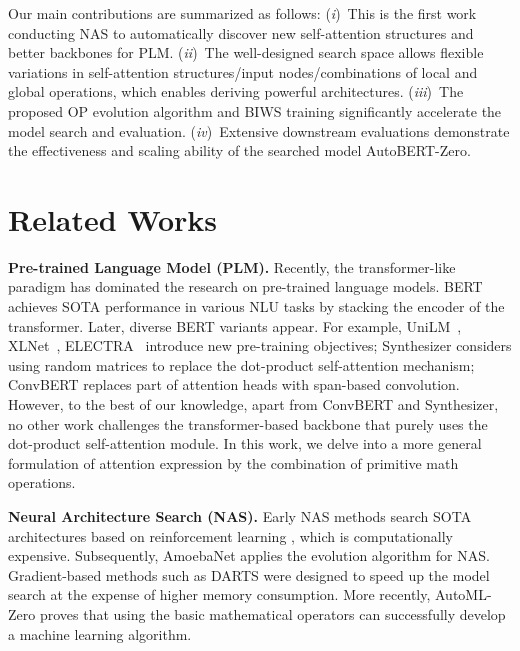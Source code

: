 \documentclass[letterpaper]{article} \usepackage{aaai22}  \usepackage{times}  \usepackage{helvet}  \usepackage{courier}  \usepackage[hyphens]{url}  \usepackage{graphicx} \urlstyle{rm} \def\UrlFont{\rm}  \usepackage{natbib}  \usepackage{caption} \DeclareCaptionStyle{ruled}{labelfont=normalfont,labelsep=colon,strut=off} \frenchspacing  \setlength{\pdfpagewidth}{8.5in}  \setlength{\pdfpageheight}{11in}  \usepackage{algorithm}
\newcommand{\Ni}{({\em i})~}
\newcommand{\Nii}{({\em ii})~}
\newcommand{\Niii}{({\em iii})~}
\newcommand{\Niv}{({\em iv})~}
\begin{document}
Our main contributions are summarized as follows:
\Ni This is the first work conducting NAS to automatically discover new self-attention structures and better backbones for PLM. 
\Nii The well-designed search space allows flexible variations in self-attention structures/input nodes/combinations of local and global operations, which enables deriving powerful architectures. 
\Niii The proposed OP evolution algorithm and BIWS training significantly accelerate the model search and evaluation.
\Niv Extensive downstream evaluations demonstrate the effectiveness and scaling ability of the searched model AutoBERT-Zero.




\vspace{-2mm}
\section{Related Works}\label{sec:related_work}
\textbf{Pre-trained Language Model (PLM).}
Recently, the transformer-like paradigm \citep{vaswani2017attention,radford2018improving} has dominated the research on pre-trained language models.
BERT \citep{devlin2019bert} achieves SOTA performance in various NLU tasks by stacking the encoder of the transformer.
Later, diverse BERT variants appear. For example, UniLM~\citep{dong2019unified}, XLNet~\cite{yang2019xlnet}, ELECTRA~\cite{clark2019electra} introduce new pre-training objectives;
Synthesizer \citep{tay2020synthesizer} considers using random matrices to replace the dot-product self-attention mechanism; ConvBERT \citep{jiang2020convbert} replaces part of attention heads with span-based convolution. However, to the best of our knowledge, apart from ConvBERT and Synthesizer, no other work challenges the transformer-based backbone that purely uses the dot-product self-attention module.
In this work, we delve into a more general formulation of attention expression by the combination of primitive math operations.


\textbf{Neural Architecture Search (NAS).} 
Early NAS methods search SOTA architectures based on reinforcement learning \citep{zoph2016neural}, which is computationally expensive. Subsequently, AmoebaNet \citep{real2019regularized} applies the evolution algorithm for NAS. 
Gradient-based methods such as DARTS \citep{liu2018darts} were designed to speed up the model search at the expense of higher memory consumption. 
More recently, AutoML-Zero \citep{real2020automlzero} proves that using the basic mathematical operators can successfully develop a machine learning algorithm. 
\end{document}
